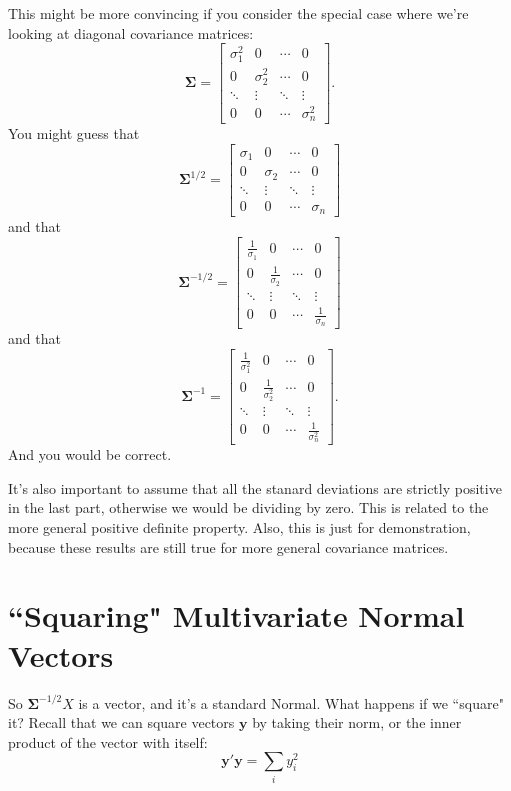 \documentclass{article}\usepackage[]{graphicx}\usepackage[]{color}
\begin{document}
This might be more convincing if you consider the special case where we're looking at diagonal covariance matrices:
\[
\bm{\Sigma} = 
\left[\begin{array}{cccc}
\sigma^2_1 & 0 & \cdots & 0 \\
0 & \sigma^2_2 & \cdots & 0 \\
\ddots & \vdots & \ddots & \vdots \\
0 & 0 & \cdots & \sigma^2_n
\end{array}\right].
\]
You might guess that
\[
\bm{\Sigma}^{1/2} = 
\left[\begin{array}{cccc}
\sigma_1 & 0 & \cdots & 0 \\
0 & \sigma_2 & \cdots & 0 \\
\ddots & \vdots & \ddots & \vdots \\
0 & 0 & \cdots & \sigma_n
\end{array}\right]
\]
and that
\[
\bm{\Sigma}^{-1/2} = 
\left[\begin{array}{cccc}
\frac{1}{\sigma_1} & 0 & \cdots & 0 \\
0 & \frac{1}{\sigma_2} & \cdots & 0 \\
\ddots & \vdots & \ddots & \vdots \\
0 & 0 & \cdots & \frac{1}{\sigma_n}
\end{array}\right]
\]
and that
\[
\bm{\Sigma}^{-1} = 
\left[\begin{array}{cccc}
\frac{1}{\sigma^2_1} & 0 & \cdots & 0 \\
0 & \frac{1}{\sigma^2_2} & \cdots & 0 \\
\ddots & \vdots & \ddots & \vdots \\
0 & 0 & \cdots & \frac{1}{\sigma^2_n}
\end{array}\right].
\]
And you would be correct.


It's also important to assume that all the stanard deviations are strictly positive in the last part, otherwise we would be dividing by zero. This is related to the more general positive definite property. Also, this is just for demonstration, because these results are still true for more general covariance matrices.

\section{``Squaring" Multivariate Normal Vectors}

So $\bm{\Sigma}^{-1/2}X$ is a vector, and it's a standard Normal. What happens if we ``square" it? Recall that we can square vectors $\mathbf{y}$ by taking their norm, or the inner product of the vector with itself:
\[
\mathbf{y}'\mathbf{y} = \sum_i y_i^2
\]
\end{document}
